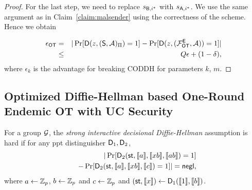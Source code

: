 \begin{proof}
For the last step, we need to replace $s_{\mathsf{B},i^*}$ with $s_{\mathsf{A},i^*}$. We use the same argument as in Claim~\ref{claim:malsender} using the correctness of the scheme. Hence we obtain

\begin{eqnarray*}
\epsilon_{\mathsf{OT}} &=&|\Pr[\mathsf D(z,(\mathsf{S}, \mathcal{A})_{\Pi})=1] -\Pr[\mathsf D(z,(\mathcal{F}_{\mathsf{OT}}^\mathsf{E},\mathcal{A}))=1]|\\
&\leq &Q\epsilon+(1-\delta),
\end{eqnarray*}
where $\epsilon_{k}$ is the advantage for breaking CODDH for parameters $k$, $m$.
\end{proof}


\iffalse
\subsection{Optimized Diffie-Hellman based One-Round Endemic OT with UC Security }\label{sec:ddhProof}



\begin{definition}\label{def:SIDDH}
	For a group $\mathcal{G}$, the \emph{strong interactive decisional Diffie-Hellman} assumption is hard if for any ppt distinguisher $\mathsf D_1,\mathsf D_2$,
	\begin{eqnarray*}
		&&|\Pr[ \mathsf D_2(\mathsf{st},\llbracket a\rrbracket,\llbracket xb\rrbracket,\llbracket ab\rrbracket)=1]\\
		&&-\Pr[ \mathsf D_2(\mathsf{st},\llbracket a\rrbracket,\llbracket xb\rrbracket,\llbracket c\rrbracket)=1]|=\mathsf{negl},
	\end{eqnarray*}
	where $a\leftarrow\mathbb Z_p$, $b\leftarrow\mathbb Z_p$ and $c\leftarrow\mathbb Z_p$ and $(\mathsf{st},\llbracket x\rrbracket)\leftarrow\mathsf D_1(\llbracket 1\rrbracket,\llbracket b\rrbracket)$.
\end{definition}

